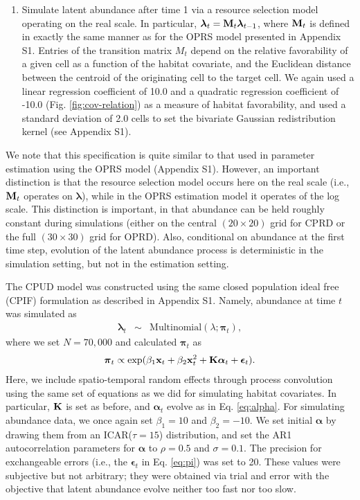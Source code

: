 \documentclass[12pt,fleqn]{article}
\begin{document}
\begin{flushleft}
\begin{enumerate}
  \item Simulate latent abundance after time 1 via a resource selection model operating on the real scale.  In particular, $\boldsymbol{\lambda}_t = {\bf M}_t \boldsymbol{\lambda}_{t-1}$, where ${\bf M}_t$ is defined in exactly the same manner as for the OPRS model presented in Appendix S1.  Entries of the transition matrix $M_t$ depend on the relative favorability of a given cell as a function of the habitat covariate, and the Euclidean distance between the centroid of the originating cell to the target cell. We again used a linear regression coefficient of 10.0 and a quadratic regression coefficient of -10.0 (Fig. \ref{fig:cov-relation}) as a measure of habitat favorability, and used a standard deviation of 2.0 cells to set the bivariate Gaussian redistribution kernel (see Appendix S1).
\end{enumerate}
We note that this specification is quite similar to that used in parameter estimation using the OPRS model (Appendix S1).  However, an important distinction is that the resource selection model occurs here on the real scale (i.e., ${\bf M}_t$ operates on $\boldsymbol{\lambda}$), while in the OPRS estimation model it operates of the log scale. This distinction is important, in that abundance can be held roughly constant during simulations (either on the central $(20 \times 20)$ grid for CPRD or the full $(30 \times 30)$ grid for OPRD).  Also, conditional on abundance at the first time step, evolution of the latent abundance process is deterministic in the simulation setting, but not in the estimation setting.

\hspace{.5in} The CPUD model was constructed using the same closed population ideal free (CPIF) formulation as described in Appendix S1.  Namely, abundance at time $t$ was simulated as
\begin{eqnarray*}
  \boldsymbol{\lambda}_t & \sim & \text{Multinomial}(\lambda; \boldsymbol{\pi}_t),
\end{eqnarray*}
where we set $N=70,000$ and calculated $\boldsymbol{\pi}_t$ as
\begin{eqnarray}
  \boldsymbol{\pi}_{t} \propto \exp(\beta_1 {\bf x}_t + \beta_2 {\bf x}_t^2 + {\bf K}\boldsymbol{\alpha}_t + \boldsymbol{\epsilon}_t).
  \label{eq:pi}
\end{eqnarray}
Here, we include spatio-temporal random effects through process convolution using the same set of equations as we did for simulating habitat covariates.  In particular, ${\bf K}$ is set as before, and $\boldsymbol{\alpha}_t$ evolve as in Eq. \ref{eq:alpha}.  For simulating abundance data, we once again set $\beta_1 = 10$ and $\beta_2 = -10$.  We set initial $\boldsymbol{\alpha}$ by drawing them from an ICAR($\tau=15$) distribution, and set the AR1 autocorrelation parameters for $\boldsymbol{\alpha}$ to $\rho = 0.5 $ and $\sigma = 0.1$.  The precision for exchangeable errors (i.e., the $\boldsymbol{\epsilon}_t$ in Eq. \ref{eq:pi}) was set to 20.  These values were subjective but not arbitrary; they were obtained via trial and error with the objective that latent abundance evolve neither too fast nor too slow.


\end{flushleft}
\end{document}
